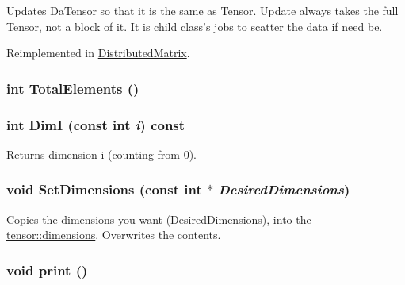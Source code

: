 Updates DaTensor so that it is the same as Tensor. Update always takes the full Tensor, not a block of it. It is child class's jobs to scatter the data if need be. 

Reimplemented in \hyperlink{classJKBuilder_1_1DistributedMatrix_a6a378face23ba83b2431cb08e8519066}{DistributedMatrix}.\hypertarget{classJKBuilder_1_1tensor_a537b2f14296e2f0e62f00e1703c5fa08}{
\subsubsection[{TotalElements}]{\setlength{\rightskip}{0pt plus 5cm}int TotalElements ()}}
\label{classJKBuilder_1_1tensor_a537b2f14296e2f0e62f00e1703c5fa08}
\hypertarget{classJKBuilder_1_1tensor_a6bdcfca6493bc217b607317dbceb28b2}{
\subsubsection[{DimI}]{\setlength{\rightskip}{0pt plus 5cm}int DimI (const int {\em i}) const}}
\label{classJKBuilder_1_1tensor_a6bdcfca6493bc217b607317dbceb28b2}


Returns dimension i (counting from 0). \hypertarget{classJKBuilder_1_1tensor_ace6bcf62c74395ab9e37abc4935f66e0}{
\subsubsection[{SetDimensions}]{\setlength{\rightskip}{0pt plus 5cm}void SetDimensions (const int $\ast$ {\em DesiredDimensions})}}
\label{classJKBuilder_1_1tensor_ace6bcf62c74395ab9e37abc4935f66e0}


Copies the dimensions you want (DesiredDimensions), into the \hyperlink{classJKBuilder_1_1tensor_a2ce1e6e0782ddee097f2c4aa2663d3e9}{tensor::dimensions}. Overwrites the contents. \hypertarget{classJKBuilder_1_1tensor_a388f572c62279f839ee138a9afbdeeb5}{
\subsubsection[{print}]{\setlength{\rightskip}{0pt plus 5cm}void print ()}}
\label{classJKBuilder_1_1tensor_a388f572c62279f839ee138a9afbdeeb5}


